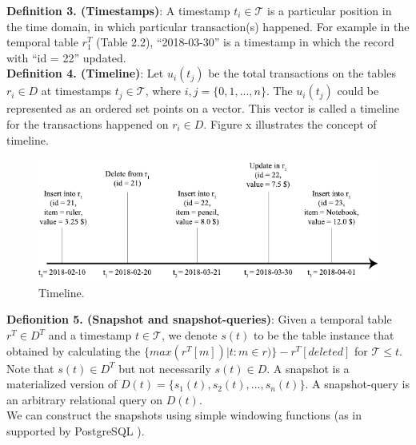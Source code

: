 \textbf{Definition 3. (Timestamps)}: A timestamp $t_i \in \mathcal{T}$ is a particular position in the time domain, in which particular transaction(s) happened. For example in the temporal table $r_1^T$ (Table 2.2), ``2018-03-30'' is a timestamp in which the record with ``id = 22'' updated. \\

\textbf{Definition 4. (Timeline)}: Let $u_i(t_j)$ be the total transactions on the tables $r_i \in D$ at timestamps $t_j \in \mathcal{T}$, where $i,j=\{0,1,...,n\}$. The $u_i(t_j)$ could be represented as an ordered set points on a vector. This vector is called a timeline for the transactions happened on $r_i \in D$. Figure x illustrates the concept of timeline.\\
\begin{figure}[H]
	\label{fig:timeline}
	\centering
	\includegraphics[width=\textwidth]{figs/timeline.pdf}
	\caption{Timeline.}
\end{figure}

\textbf{Defionition 5. (Snapshot and snapshot-queries)}: Given a temporal table $r^T \in D^T$ and a timestamp $t \in \mathcal{T}$, we denote $s(t)$ to be the table instance that obtained by calculating the $\{max(r^T[m])|t : m\in r)\}-r^T[deleted]$ for $\mathcal{T}\leq t$. Note that $s(t) \in D^T$ but not necessarily $s(t) \in D$. A snapshot is a materialized version of $D(t) = \{s_1(t),s_2(t),...,s_n(t)\}$. A snapshot-query is an arbitrary relational query on $D(t)$.\\

We can construct the snapshots using simple windowing functions (as in supported
by PostgreSQL \cite{momjian2001postgresql}).

